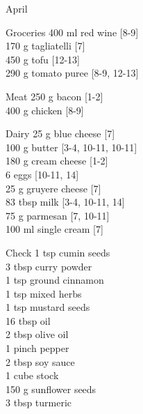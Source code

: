 \begin{menu}{April}
\begin{shoppinglist}{Groceries}
      400 ml red wine {\scriptsize[8-9]}\\
      170 g tagliatelli {\scriptsize[7]}\\
      450 g tofu {\scriptsize[12-13]}\\
      290 g tomato puree {\scriptsize[8-9, 12-13]}\\
      \end{shoppinglist}%
      \par\vfil %
      \begin{shoppinglist}{Meat}
      250 g bacon {\scriptsize[1-2]}\\
      400 g chicken {\scriptsize[8-9]}\\
      \end{shoppinglist}%
      \begin{shoppinglist}{Dairy}
      25 g blue cheese {\scriptsize[7]}\\
      100 g butter {\scriptsize[3-4, 10-11, 10-11]}\\
      180 g cream cheese {\scriptsize[1-2]}\\
      6  eggs {\scriptsize[10-11, 14]}\\
      25 g gruyere cheese {\scriptsize[7]}\\
      83 tbsp milk {\scriptsize[3-4, 10-11, 14]}\\
      75 g parmesan {\scriptsize[7, 10-11]}\\
      100 ml single cream {\scriptsize[7]}\\
      \end{shoppinglist}%
      \par\vfil %
      \vfil\clearpage %
      \begin{shoppinglist}{Check}
      1 tsp cumin seeds \\
      3 tbsp curry powder \\
      1 tsp ground cinnamon \\
      1 tsp mixed herbs \\
      1 tsp mustard seeds \\
      16 tbsp oil \\
      2 tbsp olive oil \\
      1 pinch pepper \\
      2 tbsp soy sauce \\
      1 cube stock \\
      150 g sunflower seeds \\
      3 tbsp turmeric \\

\end{shoppinglist}
\end{menu}
